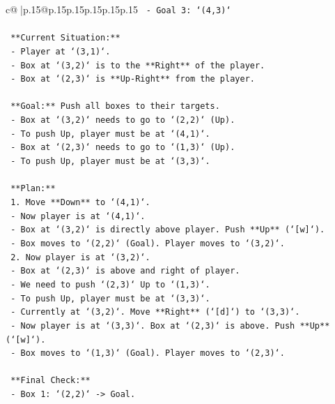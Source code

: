 \documentclass{article}
\begin{document}
{\begin{supertabular}{c@{$\;$}|p{.15\linewidth}@{}p{.15\linewidth}p{.15\linewidth}p{.15\linewidth}p{.15\linewidth}p{.15\linewidth}}
{{{\texttt{      {-} Goal 3: `(4,3)`} \\
\\ 
\texttt{      **Current Situation:**} \\
\texttt{      {-} Player at `(3,1)`.} \\
\texttt{      {-} Box at `(3,2)` is to the **Right** of the player.} \\
\texttt{      {-} Box at `(2,3)` is **Up{-}Right** from the player.} \\
\\ 
\texttt{      **Goal:** Push all boxes to their targets.} \\
\texttt{      {-} Box at `(3,2)` needs to go to `(2,2)` (Up).} \\
\texttt{        {-} To push Up, player must be at `(4,1)`.} \\
\texttt{      {-} Box at `(2,3)` needs to go to `(1,3)` (Up).} \\
\texttt{        {-} To push Up, player must be at `(3,3)`.} \\
\\ 
\texttt{      **Plan:**} \\
\texttt{      1. Move **Down** to `(4,1)`.} \\
\texttt{         {-} Now player is at `(4,1)`.} \\
\texttt{         {-} Box at `(3,2)` is directly above player. Push **Up** (`{[}w{]}`).} \\
\texttt{         {-} Box moves to `(2,2)` (Goal). Player moves to `(3,2)`.} \\
\texttt{      2. Now player is at `(3,2)`.} \\
\texttt{         {-} Box at `(2,3)` is above and right of player.} \\
\texttt{         {-} We need to push `(2,3)` Up to `(1,3)`.} \\
\texttt{         {-} To push Up, player must be at `(3,3)`.} \\
\texttt{         {-} Currently at `(3,2)`. Move **Right** (`{[}d{]}`) to `(3,3)`.} \\
\texttt{         {-} Now player is at `(3,3)`. Box at `(2,3)` is above. Push **Up** (`{[}w{]}`).} \\
\texttt{         {-} Box moves to `(1,3)` (Goal). Player moves to `(2,3)`.} \\
\\ 
\texttt{      **Final Check:**} \\
\texttt{      {-} Box 1: `(2,2)` {-}> Goal.} \\
}}}
\end{supertabular}}
\end{document}

